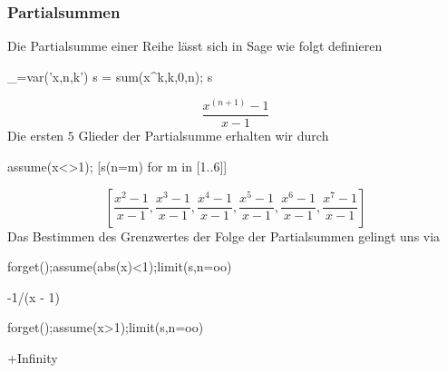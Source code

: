 \documentclass[fontsize=12pt,paper=a4,twoside,bibtotoc,idxtotoc,
liststotoc,pagesize,BCOR1.2cm,DIV15,chapterprefix,pagesize=pdftex]{scrbook}
\theoremstyle{plain}
\theoremstyle{definition}
\theoremstyle{remark}
\begin{document}
\subsubsection{Partialsummen}
Die Partialsumme einer Reihe lässt sich in Sage wie folgt definieren
\begin{sagein}
_=var('x,n,k')
s = sum(x^k,k,0,n); s
\end{sagein}
{\color{blue}\[\frac{x^{{\left(n + 1\right)}} - 1}{x - 1}\]}
Die ersten $5$ Glieder der Partialsumme erhalten wir durch
\begin{sagein}
assume(x<>1); [s(n=m) for m in [1..6]]
\end{sagein}
{\color{blue}\[\left[\frac{x^{2} - 1}{x - 1}, \frac{x^{3} - 1}{x - 1}, \frac{x^{4} - 1}{x - 1}, \frac{x^{5} - 1}{x - 1}, \frac{x^{6} - 1}{x - 1}, \frac{x^{7} - 1}{x - 1}\right] \]}
Das Bestimmen des Grenzwertes der Folge der Partialsummen gelingt uns via
\begin{sagein}
forget();assume(abs(x)<1);limit(s,n=oo)
\end{sagein}
\begin{sageout}
-1/(x - 1)
\end{sageout}
\begin{sagein}
forget();assume(x>1);limit(s,n=oo)
\end{sagein}
\begin{sageout}
+Infinity
\end{sageout}
\end{document}
